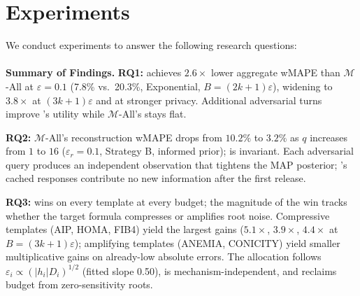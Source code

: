 \section{Experiments}

We conduct experiments to answer the following research questions:\\
 
\noindent{}\\

\noindent\textbf{Summary of Findings.}
\textbf{RQ1:} \sysname{} achieves $2.6\times$ lower aggregate wMAPE than $\mathcal{M}$-All at $\varepsilon = 0.1$ (7.8\% vs.\ 20.3\%, Exponential, $B = (2k{+}1)\varepsilon$), widening to $3.8\times$ at $(3k{+}1)\varepsilon$ and at stronger privacy. Additional adversarial turns improve \sysname{}'s utility while $\mathcal{M}$-All's stays flat.

\textbf{RQ2:} $\mathcal{M}$-All's reconstruction wMAPE drops from $10.2\%$ to $3.2\%$ as $q$ increases from $1$ to $16$ ($\varepsilon_r = 0.1$, Strategy B, informed prior); \sysname{} is invariant. Each adversarial query produces an independent observation that tightens the MAP posterior; \sysname{}'s cached responses contribute no new information after the first release.

\textbf{RQ3:} \sysname{} wins on every template at every budget; the magnitude of the win tracks whether the target formula compresses or amplifies root noise. Compressive templates (AIP, HOMA, FIB4) yield the largest gains ($5.1\times$, $3.9\times$, $4.4\times$ at $B=(3k{+}1)\varepsilon$); amplifying templates (ANEMIA, CONICITY) yield smaller multiplicative gains on already-low absolute errors. The allocation follows $\varepsilon_i \propto (|h_i| D_i)^{1/2}$ (fitted slope 0.50), is mechanism-independent, and reclaims budget from zero-sensitivity roots.

